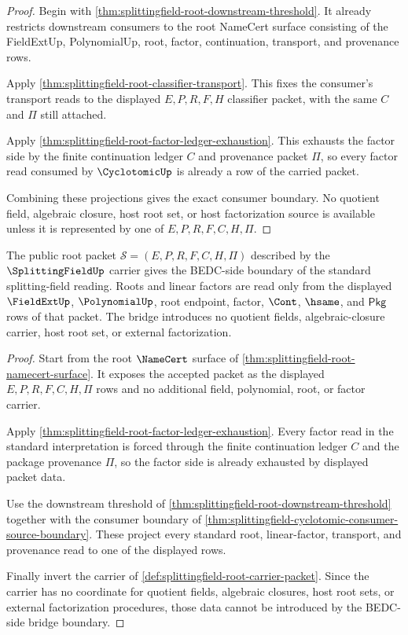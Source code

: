 \begin{proof}
Begin with
\autoref{thm:splittingfield-root-downstream-threshold}. It already restricts
downstream consumers to the root NameCert surface consisting of the
FieldExtUp, PolynomialUp, root, factor, continuation, transport, and provenance
rows.

Apply \autoref{thm:splittingfield-root-classifier-transport}. This fixes the
consumer's transport reads to the displayed $E,P,R,F,H$ classifier packet, with
the same $C$ and $\Pi$ still attached.

Apply \autoref{thm:splittingfield-root-factor-ledger-exhaustion}. This
exhausts the factor side by the finite continuation ledger $C$ and provenance
packet $\Pi$, so every factor read consumed by $\CyclotomicUp$ is already a row
of the carried packet.

Combining these projections gives the exact consumer boundary. No quotient
field, algebraic closure, host root set, or host factorization source is
available unless it is represented by one of $E,P,R,F,C,H,\Pi$.
\end{proof}

\begin{theorem}
\label{thm:splittingfield-standard-bridge-boundary}
The public root packet $\mathcal{S}=(E,P,R,F,C,H,\Pi)$ described by the $\SplittingFieldUp$ carrier gives the BEDC-side boundary of the standard splitting-field reading. Roots and linear factors are read only from the displayed $\FieldExtUp$, $\PolynomialUp$, root endpoint, factor, $\Cont$, $\hsame$, and $\mathsf{Pkg}$ rows of that packet. The bridge introduces no quotient fields, algebraic-closure carrier, host root set, or external factorization.
\end{theorem}
\begin{proof}
Start from the root $\NameCert$ surface of \autoref{thm:splittingfield-root-namecert-surface}. It exposes the accepted packet as the displayed $E,P,R,F,C,H,\Pi$ rows and no additional field, polynomial, root, or factor carrier.

Apply \autoref{thm:splittingfield-root-factor-ledger-exhaustion}. Every factor read in the standard interpretation is forced through the finite continuation ledger $C$ and the package provenance $\Pi$, so the factor side is already exhausted by displayed packet data.

Use the downstream threshold of \autoref{thm:splittingfield-root-downstream-threshold} together with the consumer boundary of \autoref{thm:splittingfield-cyclotomic-consumer-source-boundary}. These project every standard root, linear-factor, transport, and provenance read to one of the displayed rows.

Finally invert the carrier of \autoref{def:splittingfield-root-carrier-packet}. Since the carrier has no coordinate for quotient fields, algebraic closures, host root sets, or external factorization procedures, those data cannot be introduced by the BEDC-side bridge boundary.
\end{proof}

